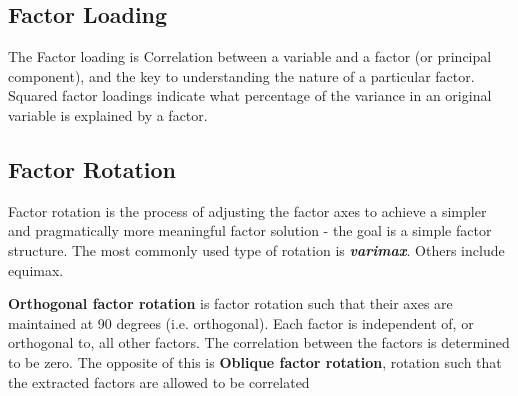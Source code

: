 \subsection{Factor Loading}
The Factor loading is Correlation between a variable and a factor (or principal component), and the key to understanding the nature of a particular factor. Squared factor loadings indicate what percentage of the variance in an original variable is explained by a factor.

\subsection{Factor Rotation}
Factor rotation is the process of adjusting the factor axes to achieve a simpler and pragmatically more meaningful factor solution - the goal is a simple factor structure. The most commonly used type of rotation is \emph{\textbf{varimax}}. Others include equimax.

\textbf{Orthogonal factor rotation} is factor rotation such that their axes are maintained at 90 degrees (i.e. orthogonal). Each factor is independent of, or orthogonal to, all other factors. The correlation between the factors is determined to be zero. The opposite of this is \textbf{Oblique factor rotation}, rotation such that the extracted factors are allowed to be correlated
